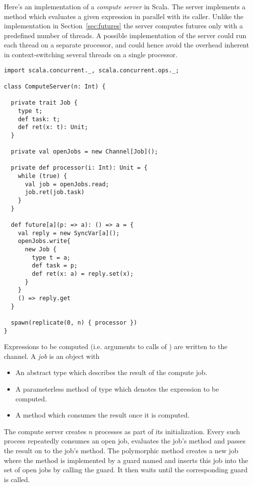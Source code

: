 {Here's an implementation of a {\em compute server} in Scala. The
server implements a  method which evaluates a given
expression in parallel with its caller. Unlike the implementation in
Section~\ref{sec:futures} the server computes futures only with a
predefined number of threads. A possible implementation of the server
could run each thread on a separate processor, and could hence avoid
the overhead inherent in context-switching several threads on a single
processor.

\begin{lstlisting}
import scala.concurrent._, scala.concurrent.ops._;

class ComputeServer(n: Int) {

  private trait Job {
    type t;
    def task: t;
    def ret(x: t): Unit;
  }

  private val openJobs = new Channel[Job]();

  private def processor(i: Int): Unit = {
    while (true) {
      val job = openJobs.read;
      job.ret(job.task) 
    }
  }

  def future[a](p: => a): () => a = {
    val reply = new SyncVar[a]();
    openJobs.write{
      new Job { 
        type t = a;
        def task = p;
        def ret(x: a) = reply.set(x);
      }
    }
    () => reply.get
  }

  spawn(replicate(0, n) { processor })
}
\end{lstlisting}
Expressions to be computed (i.e. arguments
to calls of ) are written to the 
channel. A {\em job} is an object with
\begin{itemize}
\item
An abstract type  which describes the result of the compute
job.
\item
A parameterless  method of type  which denotes
the expression to be computed.
\item
A  method which consumes the result once it is
computed.
\end{itemize}
The compute server creates $n$  processes as part of
its initialization.  Every such process repeatedly consumes an open
job, evaluates the job's  method and passes the result on
to the job's
 method. The polymorphic  method creates
a new job where the  method is implemented by a guard
named  and inserts this job into the set of open jobs by
calling the  guard. It then waits until the corresponding
 guard is called.

}
